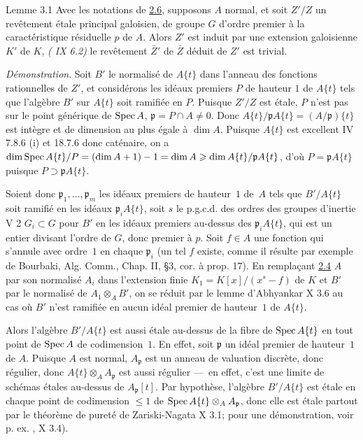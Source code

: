 \documentclass[10pt]{../fichiers-configuration-latex/smfart}
\begin{document}
\begin{enonce*}{Lemme 3.1}
Avec les notations de \hyperref[XV.lem2.6]{2.6}, supposons $A$ normal, et soit $Z'/Z$ un
revêtement étale principal galoisien, de groupe $G$ d'ordre premier à
la caractéristique résiduelle $p$ de $A$. Alors $Z'$ est induit par
une extension galoisienne $K'$ de $K$, \ie \emph{( IX 6.2)} le
revêtement $\bar{Z}'$ de $\bar{Z}$ déduit de $Z'$ est trivial.
\end{enonce*}

\noindent
\emph{Démonstration}. Soit $B'$ le normalisé de $A\{t\}$ dans l'anneau
des fonctions rationnelles de $Z'$, et considérons les idéaux premiers
$P$ de hauteur $1$ de $A\{t\}$ tels que l'algèbre $B'$ sur $A\{t\}$
soit ramifiée en $P$. Puisque $Z'/Z$ est étale, $P$ n'est pas sur le
point générique de $\operatorname{Spec} A$, \ie $\mathfrak{p}=P\cap A\neq 0$. Donc
$A\{t\}/\mathfrak{p}A\{t\}=(A/\mathfrak{p})\{t\}$ est intègre et de dimension au plus
égale à $\dim A$. Puisque $A\{t\}$ est excellent \sisi{(}{}\EGA IV 7.8.6 (i) et
18.7.6\sisi{)}{} donc caténaire, on a $\dim \operatorname{Spec} A\{t\}/P=(\dim A+1)-1=\dim
A\geqslant \dim A\{t\}/\mathfrak{p}A\{t\}$, d'où\pageoriginale
$P=\mathfrak{p}A\{t\}$ puisque $P\supset \mathfrak{p}A\{t\}$.

Soient donc $\mathfrak{p}_1,\ldots,\mathfrak{p}_m$ les idéaux premiers de hauteur~$1$
de~$A$ tels que $B'/A\{t\}$ soit ramifié en les idéaux $\mathfrak{p}_iA\{t\}$,
soit $s$ le p.g.c.d. des ordres des groupes d'inertie \sisi{(}{} V 2\sisi{)}{} $G_{i}\subset G$ pour $B'$ en les idéaux premiers au-dessus des
$\mathfrak{p}_{i}A\{t\}$, qui est un entier divisant l'ordre de $G$, donc
premier à $p$. Soit $f\in A$ une fonction qui s'annule avec ordre~$1$ en
chaque $\mathfrak{p}_i$ (un tel $f$ existe, comme il résulte par exemple de
Bourbaki, Alg. Comm., Chap. II, \S 3, cor. à prop. 17). En remplaçant
\sisi{(}{}\hyperref[XV.cor2.4]{2.4}\sisi{)}{} $A$ par son normalisé $A_i$ dans l'extension finie
$K_{1}=K[x]/(x^{s}-f)$ de $K$ et $B'$ par le normalisé de
$A_{1}\otimes_A B'$, on se réduit par le lemme d'Abhyankar
\sisi{(}{} X 3.6\sisi{)}{}
au cas où $B'$ n'est ramifiée en aucun idéal premier de hauteur~$1$ de $A\{t\}$.

Alors l'algèbre $B'/A\{t\}$ est aussi étale au-dessus de la fibre de
$\operatorname{Spec} A\{t\}$ en tout point de $\operatorname{Spec} A$ de codimension~$1$. En effet,
soit $\mathfrak{p}$ un idéal premier de hauteur~$1$ de $A$. Puisque $A$ est
normal, $A_{\mathfrak{p}}$ est un anneau de valuation discrète, donc
régulier, donc $A\{t\}\otimes_A A_{\mathfrak{p}}$ est aussi régulier
---~en effet, c'est une limite de schémas étales au-dessus de $A_{\mathfrak{p}}[t]$.
Par hypothèse, l'algèbre $B'/A\{t\}$ est étale en chaque point
de codimension $\leq 1$ de $\operatorname{Spec} A\{t\}\otimes_A A_{\mathfrak{p}}$, donc
elle est étale partout par le théorème de pureté de Zariski-Nagata
\sisi{(}{} X 3.1\sisi{)}{}; pour une démonstration, voir p. ex. , X 3.4).
\end{document}
